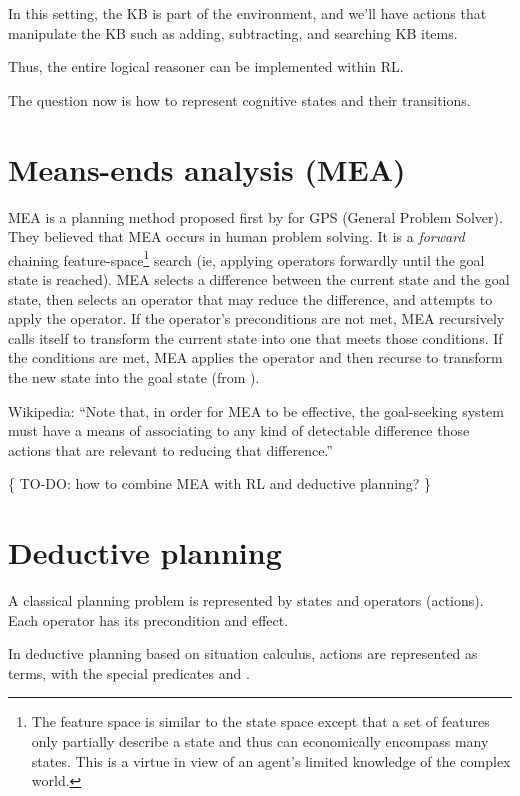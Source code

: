 In this setting, the KB is part of the environment, and we'll have actions that manipulate the KB such as adding, subtracting, and searching KB items.

Thus, the entire logical reasoner can be implemented within RL.

The question now is how to represent cognitive states and their transitions.

\section{Means-ends analysis (MEA)}

MEA is a planning method proposed first by \citep*{Newell1960} for GPS (General Problem Solver).  They believed that MEA occurs in human problem solving.  It is  a \textit{forward} chaining feature-space\footnote{The feature space is similar to the state space except that a set of features only partially describe a state and thus can economically encompass many states.  This is a virtue in view of an agent's limited knowledge of the complex world.} search (ie, applying operators forwardly until the goal state is reached).  MEA selects a difference between the current state and the goal state, then selects an operator that may reduce the difference, and attempts to apply the operator.  If the operator's preconditions are not met, MEA recursively calls itself to transform the current state into one that meets those conditions.  If the conditions are met, MEA applies the operator and then recurse to transform the new state into the goal state (from \citep*{Langley1993}).

Wikipedia:  ``Note that, in order for MEA to be effective, the goal-seeking system must have a means of associating to any kind of detectable difference those actions that are relevant to reducing that difference.''

\{ TO-DO:  how to combine MEA with RL and deductive planning? \}

\section{Deductive planning}
\label{sec:deductive-planning}

A classical planning problem is represented by states and operators (actions).  Each operator has its precondition and effect.

In deductive planning based on situation calculus, actions are represented as terms, with the special predicates  and .

